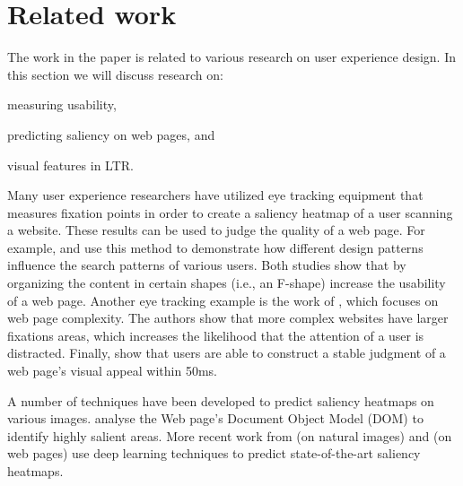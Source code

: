 
\section{Related work}\label{sec:relatedwork}

The work in the paper is related to various research on user experience design. In this section we will discuss research on:
\begin{inparaenum}[(i)]
\item measuring usability, 
\item predicting saliency on web pages, and 
\item visual features in \ac{LTR}.
\end{inparaenum} 


Many user experience researchers have utilized eye tracking equipment that measures fixation points in order to create a saliency heatmap of a user scanning a website. These results can be used to judge the quality of a web page. For example, \citet{nielsen2006f} and \citet{pernice2017f} use this method to demonstrate how different design patterns influence the search patterns of various users. Both studies show that by organizing the content in certain shapes (i.e., an F-shape) increase the usability of a web page. Another eye tracking example is the work of \citet{wang2014eye}, which focuses on web page complexity. The authors show that more complex websites have larger fixations areas, which increases the likelihood that the attention of a user is distracted. Finally, \citet{lindgaard2006attention} show that users are able to construct a stable judgment of a web page's visual appeal within 50ms. 

A number of techniques have been developed to predict saliency heatmaps on various images. \citet{buscher2009you} analyse the Web page's Document Object Model (DOM) to identify highly salient areas. More recent work from \citet{kummerer2016deepgaze} (on natural images) and \citet{shan2017two} (on web pages) use deep learning techniques to predict state-of-the-art saliency heatmaps. 

